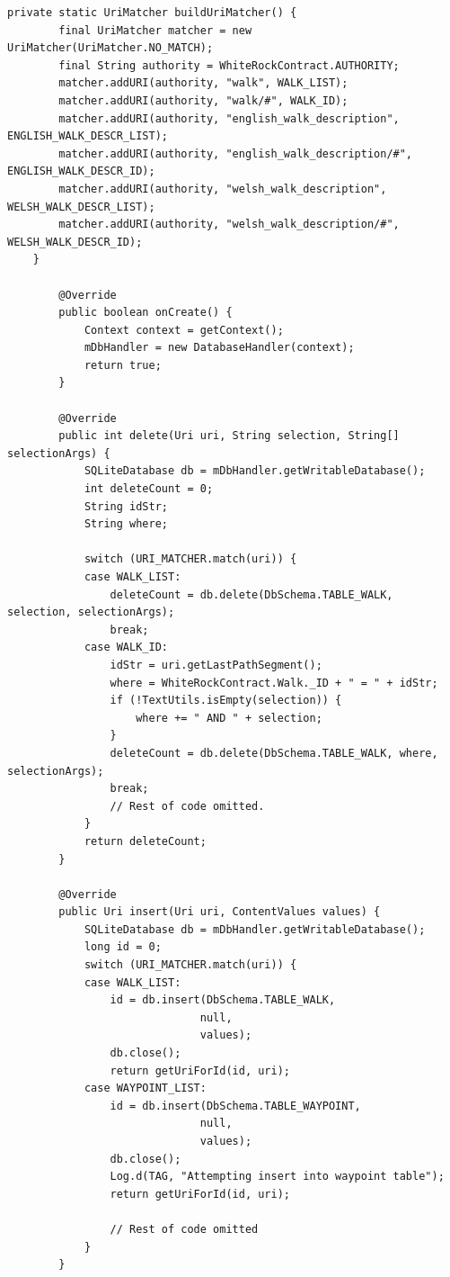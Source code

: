\documentclass[11pt,a4paper]{article}
\begin{document}
\begin{lstlisting}[captionpos=b, caption=WhiteRockContentProvider Snippet, label=lst:contentprovider, frame=single]
	private static UriMatcher buildUriMatcher() {
		final UriMatcher matcher = new UriMatcher(UriMatcher.NO_MATCH);
		final String authority = WhiteRockContract.AUTHORITY;
		matcher.addURI(authority, "walk", WALK_LIST);
		matcher.addURI(authority, "walk/#", WALK_ID);
		matcher.addURI(authority, "english_walk_description", ENGLISH_WALK_DESCR_LIST);
		matcher.addURI(authority, "english_walk_description/#", ENGLISH_WALK_DESCR_ID);
		matcher.addURI(authority, "welsh_walk_description", WELSH_WALK_DESCR_LIST);
		matcher.addURI(authority, "welsh_walk_description/#", WELSH_WALK_DESCR_ID);
	}
	
		@Override
		public boolean onCreate() {
			Context context = getContext();
			mDbHandler = new DatabaseHandler(context);
			return true;
		}
		
		@Override
		public int delete(Uri uri, String selection, String[] selectionArgs) {
			SQLiteDatabase db = mDbHandler.getWritableDatabase();
			int deleteCount = 0;
			String idStr;
			String where;
			
			switch (URI_MATCHER.match(uri)) {
			case WALK_LIST:
				deleteCount = db.delete(DbSchema.TABLE_WALK, selection, selectionArgs);
				break;
			case WALK_ID:
				idStr = uri.getLastPathSegment();
				where = WhiteRockContract.Walk._ID + " = " + idStr;
				if (!TextUtils.isEmpty(selection)) {
					where += " AND " + selection;
				}
				deleteCount = db.delete(DbSchema.TABLE_WALK, where, selectionArgs);
				break;
				// Rest of code omitted.
			}
			return deleteCount;
		}
		
		@Override
		public Uri insert(Uri uri, ContentValues values) {
			SQLiteDatabase db = mDbHandler.getWritableDatabase();
			long id = 0;
			switch (URI_MATCHER.match(uri)) {
			case WALK_LIST:
				id = db.insert(DbSchema.TABLE_WALK,
							  null,
						      values);
				db.close();
				return getUriForId(id, uri);
			case WAYPOINT_LIST:
				id = db.insert(DbSchema.TABLE_WAYPOINT,
							  null,
							  values);
				db.close();
				Log.d(TAG, "Attempting insert into waypoint table");
				return getUriForId(id, uri);
				
				// Rest of code omitted
			}
		}
		

\end{lstlisting}
\end{document}

